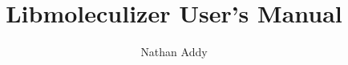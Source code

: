 \documentclass{report}
\author{Nathan Addy}
\title{Libmoleculizer \currentversion User's Manual}
\begin{document}
\maketitle

\tableofcontents












\printglossary
\printindex



\end{document}
